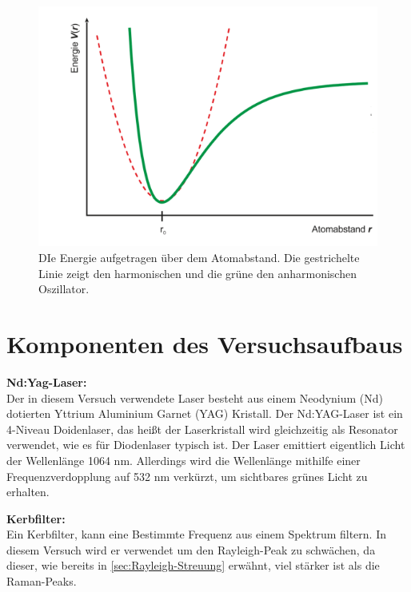 \documentclass[.../bericht]{subfilies}
\begin{document}
    \begin{figure}[tb]
      \centering
      \includegraphics[scale=0.5]{figures/oszillator}
      \caption{DIe Energie aufgetragen über dem Atomabstand. Die gestrichelte Linie zeigt den harmonischen und die grüne den anharmonischen Oszillator.}
      \label{fig:oszillator}
    \end{figure}

  \section{Komponenten des Versuchsaufbaus}

    \textbf{Nd:Yag-Laser:}\\
    Der in diesem Versuch verwendete Laser besteht aus einem Neodynium (Nd) dotierten Yttrium Aluminium Garnet (YAG) Kristall. Der Nd:YAG-Laser ist ein 4-Niveau Doidenlaser, das heißt der Laserkristall wird  gleichzeitig als Resonator verwendet, wie es für Diodenlaser typisch ist. Der Laser emittiert eigentlich Licht der Wellenlänge 1064 nm. Allerdings wird die Wellenlänge mithilfe einer Frequenzverdopplung auf 532 nm verkürzt, um sichtbares grünes Licht zu erhalten.\\
    \cite{ndyag}
    \medskip

    \textbf{Kerbfilter:}\\
    Ein Kerbfilter, kann eine Bestimmte Frequenz aus einem Spektrum filtern. In diesem Versuch wird er verwendet um den Rayleigh-Peak zu schwächen, da dieser, wie bereits in \cref{sec:Rayleigh-Streuung} erwähnt, viel stärker ist als die Raman-Peaks.\\
    \cite{wiki:kerbfilter}
    \medskip
\end{document}
